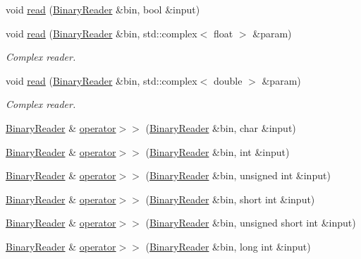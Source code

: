 \begin{DoxyCompactItemize}
\item 
void \mbox{\hyperlink{namespaceADATIO_a5f367e2dbd4baac46c87c566b42ce4ce}{read}} (\mbox{\hyperlink{classADATIO_1_1BinaryReader}{Binary\+Reader}} \&bin, bool \&input)
\item 
void \mbox{\hyperlink{namespaceADATIO_aa439c7d6dfc63d8424816de24810141d}{read}} (\mbox{\hyperlink{classADATIO_1_1BinaryReader}{Binary\+Reader}} \&bin, std\+::complex$<$ float $>$ \&param)
\begin{DoxyCompactList}\small\item\em Complex reader. \end{DoxyCompactList}\item 
void \mbox{\hyperlink{namespaceADATIO_a99479bf376afa5196fad6684a360c7af}{read}} (\mbox{\hyperlink{classADATIO_1_1BinaryReader}{Binary\+Reader}} \&bin, std\+::complex$<$ double $>$ \&param)
\begin{DoxyCompactList}\small\item\em Complex reader. \end{DoxyCompactList}\item 
\mbox{\hyperlink{classADATIO_1_1BinaryReader}{Binary\+Reader}} \& \mbox{\hyperlink{namespaceADATIO_aa4d9d42917828a10055400b295736ad5}{operator$>$$>$}} (\mbox{\hyperlink{classADATIO_1_1BinaryReader}{Binary\+Reader}} \&bin, char \&input)
\item 
\mbox{\hyperlink{classADATIO_1_1BinaryReader}{Binary\+Reader}} \& \mbox{\hyperlink{namespaceADATIO_a38e9b56ea3dfb8ea19ceb57783546c7c}{operator$>$$>$}} (\mbox{\hyperlink{classADATIO_1_1BinaryReader}{Binary\+Reader}} \&bin, int \&input)
\item 
\mbox{\hyperlink{classADATIO_1_1BinaryReader}{Binary\+Reader}} \& \mbox{\hyperlink{namespaceADATIO_ae8319d36de40198210e78469c672e6d0}{operator$>$$>$}} (\mbox{\hyperlink{classADATIO_1_1BinaryReader}{Binary\+Reader}} \&bin, unsigned int \&input)
\item 
\mbox{\hyperlink{classADATIO_1_1BinaryReader}{Binary\+Reader}} \& \mbox{\hyperlink{namespaceADATIO_af1565fd78ef164ff9cd892d032189f03}{operator$>$$>$}} (\mbox{\hyperlink{classADATIO_1_1BinaryReader}{Binary\+Reader}} \&bin, short int \&input)
\item 
\mbox{\hyperlink{classADATIO_1_1BinaryReader}{Binary\+Reader}} \& \mbox{\hyperlink{namespaceADATIO_a1252900b43fa1caf87beea30ea4d5d76}{operator$>$$>$}} (\mbox{\hyperlink{classADATIO_1_1BinaryReader}{Binary\+Reader}} \&bin, unsigned short int \&input)
\item 
\mbox{\hyperlink{classADATIO_1_1BinaryReader}{Binary\+Reader}} \& \mbox{\hyperlink{namespaceADATIO_ab87e32e5cce14b02718ac9c25a238bdd}{operator$>$$>$}} (\mbox{\hyperlink{classADATIO_1_1BinaryReader}{Binary\+Reader}} \&bin, long int \&input)

\end{DoxyCompactItemize}
